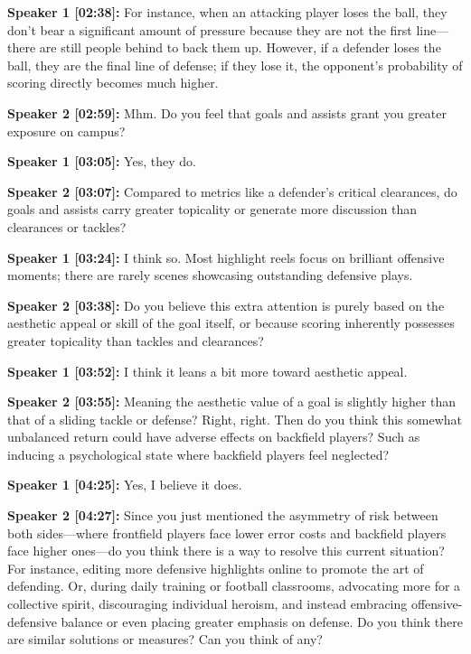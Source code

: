 \documentclass[11pt,a4paper]{article}
\begin{document}
\begin{linenumbers}
\vspace{0.5em}
\noindent \textbf{Speaker 1 [02:38]:} For instance, when an attacking player loses the ball, they don't bear a significant amount of pressure because they are not the first line---there are still people behind to back them up. However, if a defender loses the ball, they are the final line of defense; if they lose it, the opponent's probability of scoring directly becomes much higher.

\vspace{0.5em}
\noindent \textbf{Speaker 2 [02:59]:} Mhm. Do you feel that goals and assists grant you greater exposure on campus?

\vspace{0.5em}
\noindent \textbf{Speaker 1 [03:05]:} Yes, they do.

\vspace{0.5em}
\noindent \textbf{Speaker 2 [03:07]:} Compared to metrics like a defender's critical clearances, do goals and assists carry greater topicality or generate more discussion than clearances or tackles?

\vspace{0.5em}
\noindent \textbf{Speaker 1 [03:24]:} I think so. Most highlight reels focus on brilliant offensive moments; there are rarely scenes showcasing outstanding defensive plays.

\vspace{0.5em}
\noindent \textbf{Speaker 2 [03:38]:} Do you believe this extra attention is purely based on the aesthetic appeal or skill of the goal itself, or because scoring inherently possesses greater topicality than tackles and clearances?

\vspace{0.5em}
\noindent \textbf{Speaker 1 [03:52]:} I think it leans a bit more toward aesthetic appeal.

\vspace{0.5em}
\noindent \textbf{Speaker 2 [03:55]:} Meaning the aesthetic value of a goal is slightly higher than that of a sliding tackle or defense? Right, right. Then do you think this somewhat unbalanced return could have adverse effects on backfield players? Such as inducing a psychological state where backfield players feel neglected?

\vspace{0.5em}
\noindent \textbf{Speaker 1 [04:25]:} Yes, I believe it does.

\vspace{0.5em}
\noindent \textbf{Speaker 2 [04:27]:} Since you just mentioned the asymmetry of risk between both sides---where frontfield players face lower error costs and backfield players face higher ones---do you think there is a way to resolve this current situation? For instance, editing more defensive highlights online to promote the art of defending. Or, during daily training or football classrooms, advocating more for a collective spirit, discouraging individual heroism, and instead embracing offensive-defensive balance or even placing greater emphasis on defense. Do you think there are similar solutions or measures? Can you think of any?


\end{linenumbers}
\end{document}
